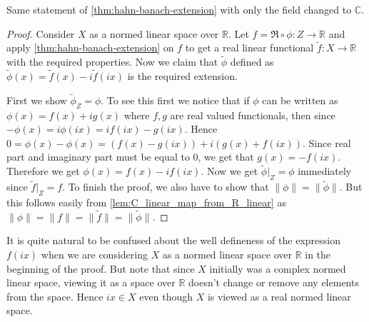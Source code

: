\begin{theorem}
  Same statement of \autoref{thm:hahn-banach-extension} with only the field changed to $\mathbb{C}$.
\end{theorem}
\begin{proof}
  Consider $X$ as a normed linear space over $\mathbb{R}$. Let $f = \Re \circ \phi: Z \to \mathbb{R}$ and apply \autoref{thm:hahn-banach-extension} on $f$ to get a real linear functional $\tilde{f}: X \to \mathbb{R}$ with the required properties. Now we claim that $\tilde{ \phi}$ defined as $\tilde{ \phi}(x) = \tilde{f}(x) - i \tilde{f}(ix)$ is the required extension.

   First we show $\tilde{ \phi}_Z = \phi$. To see this first we notice that if $ \phi$ can be written as  $\phi(x) = f( x) + ig(x)$ where $ f, g$ are real valued functionals, then since $-\phi(x) = i\phi(ix) = if(ix) - g(ix)$. Hence $0 = \phi(x) - \phi(x) = (f(x) - g(ix)) + i(g(x) + f(ix))$. Since real part and imaginary part must be equal to 0, we get that $g(x) = -f(ix)$. Therefore we get $\phi(x) = f(x) - if(ix)$.
  Now we get $\tilde{\phi}|_Z = \phi$ immediately since $ \tilde{f}|_Z = f$.
  To finish the proof, we also have to show that $\|\phi\| = \|\tilde{\phi}\|$. But this follows easily from \autoref{lem:C_linear_map_from_R_linear} as $\|\phi\| = \|f\| = \|\tilde{f}\| = \|\tilde{\phi}\|$.
\end{proof}

\begin{remark}
  It is quite natural to be confused about the well defineness of the expression $f(ix)$ when we are considering $X$ as a normed linear space over $ \mathbb{R}$ in the beginning of the proof. But note that since $X$ initially was a complex normed linear space, viewing it as a space over $\mathbb{R}$ doesn't change or remove any elements from the space. Hence $ix \in X$ even though $X$ is viewed as a real normed linear space.
\end{remark}
